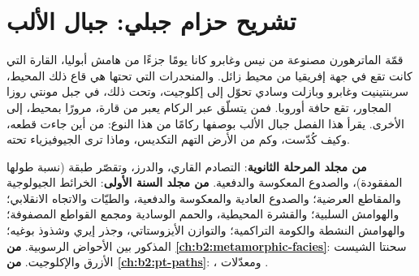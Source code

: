 \chapter{تشريح حزام جبلي: جبال الألب}\label{ch:b2:alpine-orogen}

قمّة الماترهورن مصنوعة من نيس وغابرو كانا يومًا جزءًا من هامش
أبوليا، القارة التي كانت تقع في جهة إفريقيا من محيط زائل. والمنحدرات التي تحتها
هي قاع ذلك المحيط، سربنتينيت وغابرو وبازلت وسادي تحوّل إلى إكلوجيت،
وتحت ذلك، في جبل مونتي روزا المجاور، تقع حافة أوروبا. فمن يتسلّق عبر
الركام يعبر من قارة، مرورًا بمحيط، إلى الأخرى. يقرأ هذا الفصل جبال الألب بوصفها ركامًا من هذا النوع: من أين جاءت قطعه، وكيف
كُدّست، وكم من الأرض التهم التكديس، وماذا ترى الجيوفيزياء تحته.

\begin{recall}
\textbf{من مجلد المرحلة الثانوية}: التصادم القاري، والدرز، وتقصّر
طبقة (نسبة طولها المفقودة)، والصدوع المعكوسة والدفعية. \textbf{من مجلد السنة
الأولى}: الخرائط الجيولوجية والمقاطع العرضية؛ والصدوع العادية والمعكوسة والدفعية، والطيّات
والاتجاه الانقلابي؛ والهوامش السلبية؛ والقشرة المحيطية، والحمم الوسادية ومجمع القواطع المصفوفة؛
والهوامش النشطة والكومة التراكمية؛ والتوازن الأيزوستاتي، وجذر إيري وشذوذ بوغيه؛
 المذكور بين الأحواض الرسوبية. \textbf{من
\cref{ch:b2:metamorphic-facies}}: سحنتا الشيست الأزرق والإكلوجيت. \textbf{من
\cref{ch:b2:pt-paths}}: ، ومعدّلات  .
\end{recall}

